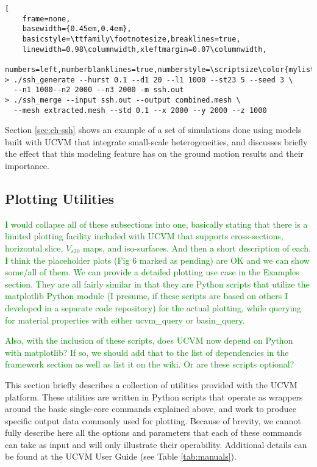 \begin{lstlisting}[
	frame=none,
	basewidth={0.45em,0.4em},
	basicstyle=\ttfamily\footnotesize,breaklines=true,
	linewidth=0.98\columnwidth,xleftmargin=0.07\columnwidth,
	numbers=left,numberblanklines=true,numberstyle=\scriptsize\color{mylistingnclr}]
> ./ssh_generate --hurst 0.1 --d1 20 --l1 1000 --st23 5 --seed 3 \
  --n1 1000--n2 2000 --n3 2000 -m ssh.out
> ./ssh_merge --input ssh.out --output combined.mesh \
  --mesh extracted.mesh --std 0.1 --x 2000 --y 2000 --z 1000
\end{lstlisting}

Section \ref{sec:ch-ssh} shows an example of a set of simulations done using models built with UCVM that integrate small-scale heterogeneities, and discusses briefly the effect that this modeling feature has on the ground motion results and their importance.

\subsection{Plotting Utilities}

\textcolor{green}{I would collapse all of these subsections into one, basically stating that there is a limited plotting facility included with UCVM that supports cross-sections, horizontal slice, $V_{s30}$ maps, and iso-surfaces. And then a short description of each. I think the placeholder plots (Fig 6 marked as pending) are OK and we can show some/all of them. We can provide a detailed plotting use case in the Examples section. They are all fairly similar in that they are Python scripts that utilize the matplotlib Python module (I presume, if these scripts are based on others I developed in a separate code repository) for the actual plotting, while querying for material properties with either ucvm\_query or basin\_query.}

\textcolor{green}{Also, with the inclusion of these scripts, does UCVM now depend on Python with matplotlib? If so, we should add that to the list of dependencies in the framework section as well as list it on the wiki. Or are these scripts optional?}

This section briefly describes a collection of utilities provided with the UCVM platform. These utilities are written in Python scripts that operate as wrappers around the basic single-core commands explained above, and work to produce specific output data commonly used for plotting. Because of brevity, we cannot fully describe here all the options and parameters that each of these commands can take as input and will only illustrate their operability. Additional details can be found at the UCVM User Guide (see Table \ref{tab:manuals}).

